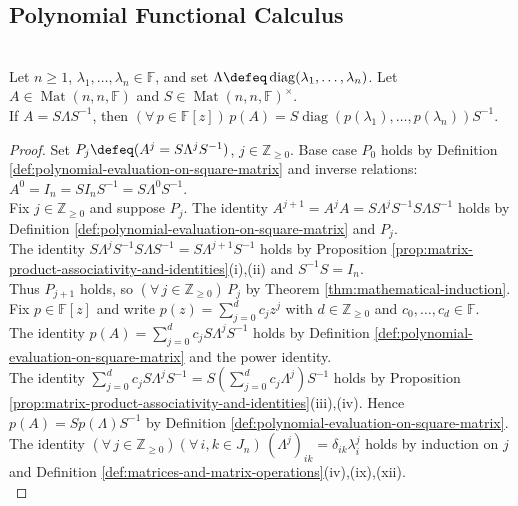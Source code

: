 \subsection{Polynomial Functional Calculus}

\begin{theorem} \label{thm:polynomial-functional-calculus-diagonalizable-matrix} \\
Let $n\geq1$, $\lambda_1,\ldots,\lambda_n\in\mathbb{F}$, and set $\Lambda\defeq\operatorname{diag}(\lambda_1,\ldots,\lambda_n)$. Let $A\in\operatorname{Mat}(n,n,\mathbb{F})$ and $S\in\operatorname{Mat}(n,n,\mathbb{F})^{\times}$.\\
If $A=S\Lambda S^{-1}$, then $(\forall\,p\in\mathbb{F}[z])\,p(A)=S\operatorname{diag}(p(\lambda_1),\ldots,p(\lambda_n))S^{-1}$.
\begin{proof}
Set $P_j\defeq(A^j=S\Lambda^jS^{-1})$, $j\in\mathbb{Z}_{\geq0}$. Base case $P_0$ holds by Definition \ref{def:polynomial-evaluation-on-square-matrix} and inverse relations: $A^0=I_n=SI_nS^{-1}=S\Lambda^0S^{-1}$.\\
Fix $j\in\mathbb{Z}_{\geq0}$ and suppose $P_j$. The identity $A^{j+1}=A^jA=S\Lambda^jS^{-1}S\Lambda S^{-1}$ holds by Definition \ref{def:polynomial-evaluation-on-square-matrix} and $P_j$.\\
The identity $S\Lambda^jS^{-1}S\Lambda S^{-1}=S\Lambda^{j+1}S^{-1}$ holds by Proposition \ref{prop:matrix-product-associativity-and-identities}(i),(ii) and $S^{-1}S=I_n$.\\
Thus $P_{j+1}$ holds, so $(\forall\,j\in\mathbb{Z}_{\geq0})\,P_j$ by Theorem \ref{thm:mathematical-induction}. Fix $p\in\mathbb{F}[z]$ and write $p(z)=\sum\limits_{j=0}^{d}c_jz^j$ with $d\in\mathbb{Z}_{\geq0}$ and $c_0,\ldots,c_d\in\mathbb{F}$.\\
The identity $p(A)=\sum\limits_{j=0}^{d}c_jS\Lambda^jS^{-1}$ holds by Definition \ref{def:polynomial-evaluation-on-square-matrix} and the power identity.\\
The identity $\sum\limits_{j=0}^{d}c_jS\Lambda^jS^{-1}=S\left(\sum\limits_{j=0}^{d}c_j\Lambda^j\right)S^{-1}$ holds by Proposition \ref{prop:matrix-product-associativity-and-identities}(iii),(iv). Hence $p(A)=Sp(\Lambda)S^{-1}$ by Definition \ref{def:polynomial-evaluation-on-square-matrix}.\\
The identity $(\forall\,j\in\mathbb{Z}_{\geq0})(\forall\,i,k\in J_n)\,(\Lambda^j)_{ik}=\delta_{ik}\lambda_i^j$ holds by induction on $j$ and Definition \ref{def:matrices-and-matrix-operations}(iv),(ix),(xii).\\

\end{proof}
\end{theorem}
